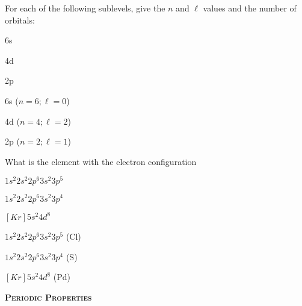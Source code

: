\documentclass[main.tex]{subfiles}
\begin{document}
\begin{multicols*}{2}
\vspace{-0.5cm}\begin{question}[ID=\the\value{numA}]
For each of the following sublevels, give the $n$ and $\ell$ values and the number of orbitals:  \begin{inparaenum}[(a)]
\item   6s 	  %
\item   4d 	  %
\item  2p	  %
\end{inparaenum}
 \end{question}
\begin{solution}
 \begin{inparaenum}[(a)]
\item   6s 	  	($n=6;\ell=0$)
\item   4d 	  	($n=4;\ell=2$)
\item  2p	  	($n=2;\ell=1$)  
\end{inparaenum}
\hspace{0.1cm}\end{solution}
\vspace{-0.5cm}\begin{question}[ID=\the\value{numA}]
What is the element with the electron configuration
\begin{inparaenum}[(a)]
\item   $1s^2 2s^2 2p^6 3s^2 3p^5$ 	  %
\item   $1s^2 2s^2 2p^6 3s^2 3p^4$	  %
\item $[Kr]5s^2 4d^8$  %
\end{inparaenum}
 \end{question}
\begin{solution}
 \begin{inparaenum}[(a)]
\item   $1s^2 2s^2 2p^6 3s^2 3p^5$ 	   (Cl)
\item   $1s^2 2s^2 2p^6 3s^2 3p^4$	   (S)
\item $[Kr]5s^2 4d^8$   (Pd)
\end{inparaenum}
\hspace{0.1cm}\end{solution}


{\raggedright\textsc{\textbf{Periodic Properties }}\par}


\end{multicols*}
\end{document}
